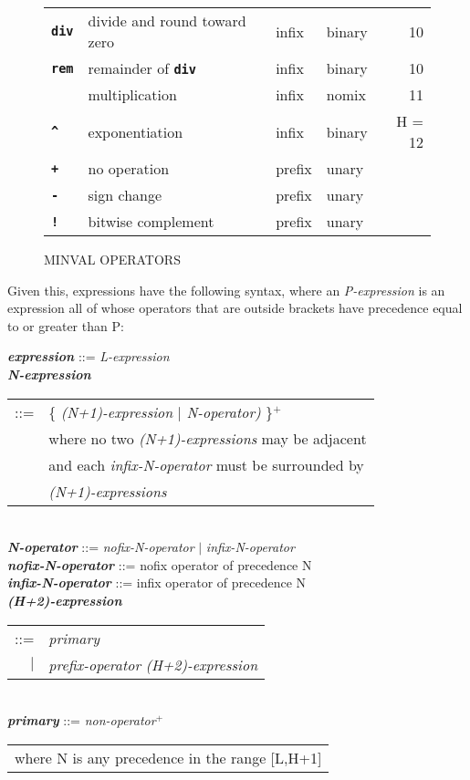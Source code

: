\documentclass[12pt]{article}
\newcommand{\TT}[1]{{\tt \bfseries #1}}
\newcommand{\PLUS}[1][]{{$^{+#1}$}}
\newcommand{\ttkey}[1]{{\tt \bfseries #1}}
\newcommand{\emkey}[1]{{\em \bfseries #1}}
\newlength{\figurewidth}
\newenvironment{boxedfigure}[1][!btp]%
	{\begin{figure*}[#1]
	 \begin{lrbox}{\figurebox}
	 \begin{minipage}{\figurewidth}

	 \vspace*{1ex}}%
	{
	 \vspace*{1ex}

	 \end{minipage}
	 \end{lrbox}

	 \vspace*{-15ex}
	 \centering
	 \fbox{\hspace*{0.1in}\usebox{\figurebox}\hspace*{0.1in}}
	 \end{figure*}}
\newenvironment{indpar}[1][0.3in]%
	{\begin{list}{}%
		     {\setlength{\itemsep}{0in}%
		      \setlength{\topsep}{0in}%
		      \setlength{\parsep}{1ex}%
		      \setlength{\labelwidth}{#1}%
		      \setlength{\leftmargin}{#1}%
		      \addtolength{\leftmargin}{\labelsep}}%
	 \item}%
	{\end{list}}
\begin{document}
\begin{boxedfigure}[!p]
\begin{center}
\begin{tabular}{|llllr|}
\ttkey{div} & divide and round toward zero & infix & binary & 10 \\
\ttkey{rem} & remainder of \TT{div} & infix & binary & 10 \\
\hline
\ttkey{*} & multiplication & infix & nomix & 11 \\
\hline
\ttkey{\textasciicircum} & exponentiation & infix & binary & H = 12 \\
\hline
\ttkey{+} & no operation & prefix & unary & \\
\ttkey{-} & sign change & prefix & unary & \\
\ttkey{!} & bitwise complement & prefix & unary & \\
\hline

\end{tabular}
\end{center}

\caption{MINVAL OPERATORS}
\label{MINVAL-OPERATORS}
\end{boxedfigure}

Given this, expressions have the following syntax,
where an {\em P-expression}
is an expression all of whose operators that are outside brackets
have precedence equal to or greater than P:

\begin{indpar}\begin{minipage}{6in}
\emkey{expression}\label{EXPRESSION} ::= {\em L-expression}
\\[0.5ex]
\emkey{N-expression}
    \begin{tabular}[t]{@{}rl}
    ::= & \{ {\em (N+1)-expression} $|$ {\em N-operator)} \}\PLUS{} \\
        & where no two {\em (N+1)-expressions} may be adjacent \\ 
        & and each {\em infix-N-operator} must be surrounded by \\
	& {\em (N+1)-expressions} \\
    \end{tabular}
\\[0.5ex]
\emkey{N-operator} ::= {\em nofix-N-operator} $|$ {\em infix-N-operator}
\\[0.5ex]
\emkey{nofix-N-operator} ::= nofix operator of precedence N
\\[0.5ex]
\emkey{infix-N-operator} ::= infix operator of precedence N
\\[0.5ex]
\emkey{(H+2)-expression}
    \begin{tabular}[t]{@{}rl}
    ::= & {\em primary} \\
    $|$ & {\em prefix-operator} {\em (H+2)-expression} \\
    \end{tabular}
\\[0.5ex]
\emkey{primary} ::= {\em non-operator}\PLUS{}
\\[2.0ex]
\hspace*{3em}\begin{tabular}{l}
where N is any precedence in the range [L,H+1]
\end{tabular}
\end{minipage}\end{indpar}
\end{document}
